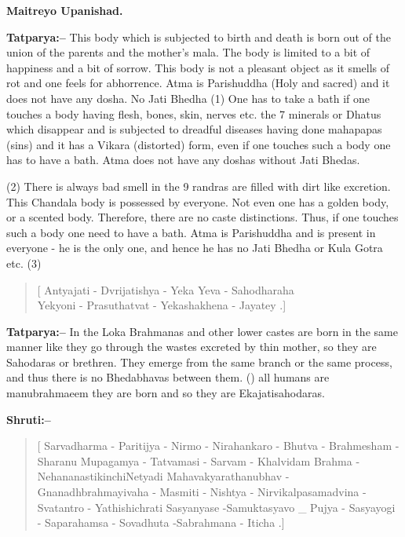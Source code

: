 \begin{flushright}
\textbf{Maitreyo Upanishad.}
\end{flushright}

\textbf{Tatparya:–} This body which is subjected to birth and death is born out of the union of the parents and the mother's mala. The body is limited to a bit of happiness and a bit of sorrow. This body is not a pleasant object as it smells of rot and one feels for abhorrence. Atma is Parishuddha (Holy and sacred) and it does not have any dosha. No Jati Bhedha (1) One has to take a bath if one touches a body having flesh, bones, skin, nerves etc. the 7 minerals or Dhatus which disappear and is subjected to dreadful diseases having done mahapapas (sins) and it has a Vikara (distorted) form, even if one touches such a body one has to have a bath. Atma does not have any doshas without Jati Bhedas.

(2) There is always bad smell in the 9 randras are filled with dirt like excretion. This Chandala body is possessed by everyone. Not even one has a golden body, or a scented body. Therefore, there are no caste distinctions. Thus, if one touches such a body one need to have a bath. Atma is Parishuddha and is present in everyone - he is the only one, and hence he has no Jati Bhedha or Kula Gotra etc. (3)

\begin{verse}
[ Antyajati - Dvrijatishya - Yeka Yeva - Sahodharaha \\ Yekyoni - Prasuthatvat - Yekashakhena - Jayatey .]
\end{verse}

\textbf{Tatparya:–} In the Loka Brahmanas and other lower castes are born in the same manner like they go through the wastes excreted by thin mother, so they are Sahodaras or brethren. They emerge from the same branch or the same process, and thus there is no Bhedabhavas between them. () all humans are manubrahmaeem they are born and so they are Ekajatisahodaras.

\newpage

\textbf{Shruti:–}

\begin{verse}
[ Sarvadharma - Paritijya - Nirmo - Nirahankaro - Bhutva - Brahmesham - Sharanu Mupagamya - Tatvamasi - Sarvam - Khalvidam Brahma - Nehananastikinchi\break Netyadi  Mahavakyarathanubhav - Gnanadhbrahma\break yivaha - Masmiti - Nishtya - Nirvikalpasamadvina -\break Svatantro - Yathishichrati  Sasyanyase -Samuktasyavo \_ Pujya - Sasyayogi - Saparahamsa - Sovadhuta -\break Sabrahmana - Iticha .]
\end{verse}

